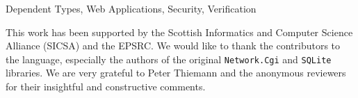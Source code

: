 \documentclass[]{sigplanconf}
\begin{document}


\keywords
Dependent Types, Web Applications, Security, Verification











\acks
This work has been supported by the Scottish Informatics and Computer Science Alliance (SICSA) and the EPSRC. We would like to thank the contributors to the \idris{} language, especially the authors of the original \texttt{Network.Cgi} and \texttt{SQLite} libraries.
We are very grateful to Peter Thiemann and the anonymous reviewers for their insightful and constructive comments.






%
%
\end{document}
